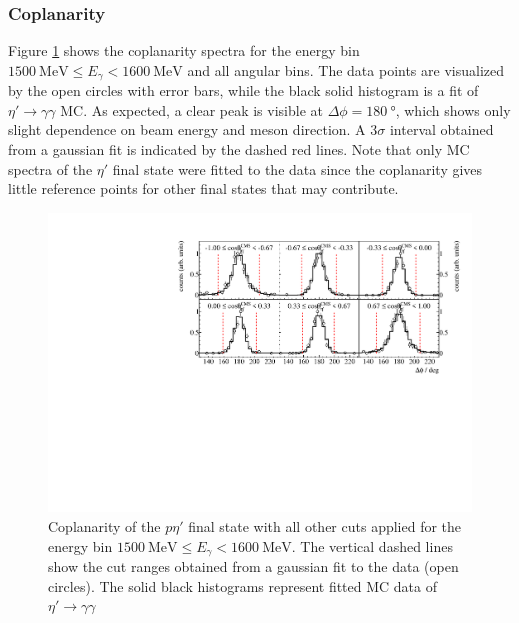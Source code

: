  \subsubsection{Coplanarity}
 Figure \ref{fig:copl} shows the coplanarity spectra for the energy bin $\SI{1500}{\mega\eV}\leq E_\gamma<\SI{1600}{\mega\eV}$ and all angular bins. The data points are visualized by the open circles with error bars, while the black solid histogram is a fit of $\eta'\to\gamma\gamma$ MC. As expected, a clear peak is visible at $\Delta\phi=\SI{180}{\degree}$, which shows only slight dependence on beam energy and meson direction. A $3\sigma$ interval obtained from a gaussian fit is indicated by the dashed red lines. Note that only MC spectra of the $\eta'$ final state were fitted to the data since the coplanarity gives little reference points for other final states that may contribute. 
   \begin{figure}[htbp]
 	\centering
 	\includegraphics[width=\linewidth]{../figs/hydrogen/bin_cuts/phicut_ebin1.pdf}
 	\caption{Coplanarity of the $p\eta'$ final state with all other cuts applied for the energy bin $\SI{1500}{\mega\eV}\leq E_\gamma<\SI{1600}{\mega\eV}$. The vertical dashed lines show the cut ranges obtained from a gaussian fit to the data (open circles). The solid black histograms represent fitted MC data of $\eta'\to\gamma\gamma$}
 	\label{fig:copl}
 \end{figure}
